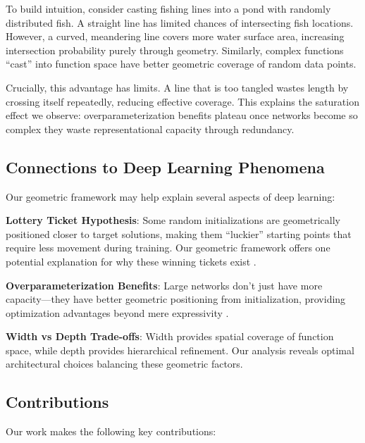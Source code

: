 To build intuition, consider casting fishing lines into a pond with randomly distributed fish. A straight line has limited chances of intersecting fish locations. However, a curved, meandering line covers more water surface area, increasing intersection probability purely through geometry. Similarly, complex functions ``cast'' into function space have better geometric coverage of random data points.

Crucially, this advantage has limits. A line that is too tangled wastes length by crossing itself repeatedly, reducing effective coverage. This explains the saturation effect we observe: overparameterization benefits plateau once networks become so complex they waste representational capacity through redundancy.

\subsection{Connections to Deep Learning Phenomena}

Our geometric framework may help explain several aspects of deep learning:

\textbf{Lottery Ticket Hypothesis}: Some random initializations are geometrically positioned closer to target solutions, making them ``luckier'' starting points that require less movement during training. Our geometric framework offers one potential explanation for why these winning tickets exist \cite{Frankle2018TheLT, Zhou2019DeconstructingLT}.

\textbf{Overparameterization Benefits}: Large networks don't just have more capacity---they have better geometric positioning from initialization, providing optimization advantages beyond mere expressivity \cite{Belkin2018ReconcilingMM, Neyshabur2017ExploringGI, AllenZhu2018LearningAG}.

\textbf{Width vs Depth Trade-offs}: Width provides spatial coverage of function space, while depth provides hierarchical refinement. Our analysis reveals optimal architectural choices balancing these geometric factors.

\subsection{Contributions}

Our work makes the following key contributions:


